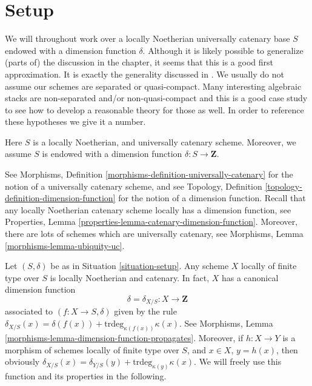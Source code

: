 \section{Setup}
\label{section-setup}

\noindent
We will throughout work over a locally Noetherian universally
catenary base $S$ endowed with a dimension function $\delta$.
Although it is likely possible to generalize (parts of) the
discussion in the chapter, it seems that this is a good first
approximation. It is exactly the generality discussed in \cite{Thorup}.
We usually do not assume our schemes are
separated or quasi-compact. Many interesting algebraic stacks
are non-separated and/or non-quasi-compact and this is a good
case study to see how to develop a reasonable theory for those as well.
In order to reference these hypotheses we give it a number.

\begin{situation}
\label{situation-setup}
Here $S$ is a locally Noetherian, and universally catenary scheme.
Moreover, we assume $S$ is endowed with a dimension function
$\delta : S \longrightarrow \mathbf{Z}$.
\end{situation}

\noindent
See Morphisms, Definition \ref{morphisms-definition-universally-catenary}
for the notion of a universally catenary scheme, and see
Topology, Definition \ref{topology-definition-dimension-function}
for the notion of a dimension function. Recall that any locally
Noetherian catenary scheme locally has a dimension function, see
Properties, Lemma \ref{properties-lemma-catenary-dimension-function}.
Moreover, there are lots of schemes which are universally catenary,
see Morphisms, Lemma \ref{morphisms-lemma-ubiquity-uc}.

\medskip\noindent
Let $(S, \delta)$ be as in Situation \ref{situation-setup}.
Any scheme $X$ locally of finite type over $S$ is locally Noetherian
and catenary. In fact, $X$ has a canonical dimension function
$$
\delta = \delta_{X/S} : X \longrightarrow \mathbf{Z}
$$
associated to $(f : X \to S, \delta)$ given by the rule
$\delta_{X/S}(x) = \delta(f(x)) + \text{trdeg}_{\kappa(f(x))}\kappa(x)$.
See Morphisms, Lemma \ref{morphisms-lemma-dimension-function-propagates}.
Moreover, if $h : X \to Y$ is a morphism of schemes locally of finite
type over $S$, and $x \in X$, $y = h(x)$,
then obviously
$\delta_{X/S}(x) = \delta_{Y/S}(y) + \text{trdeg}_{\kappa(y)}\kappa(x)$.
We will freely use this function and its properties in the following.

